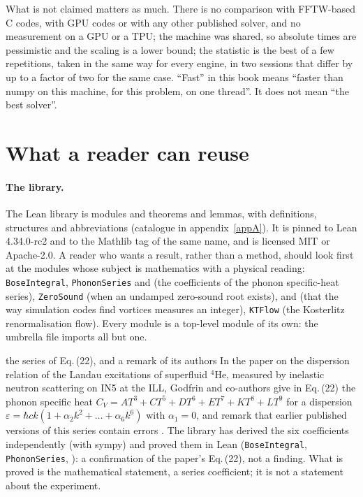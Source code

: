 What is not claimed matters as much. There is no comparison with FFTW-based C codes, with GPU codes or with any other published solver, and no
measurement on a GPU or a TPU; the machine was shared, so absolute times are pessimistic and the scaling is a lower bound; the statistic is the best
of a few repetitions, taken in the same way for every engine, in two sessions that differ by up to a factor of two for the same case. ``Fast'' in this
book means ``faster than numpy on this machine, for this problem, on one thread''. It does not mean ``the best solver''.

\section{What a reader can reuse}\label{ch10:sec-legacy}

\paragraph{The library.} The Lean library \cite{Callens2026lib} is \NxLibModules{} modules and \NxLibThm{} theorems and lemmas, with \NxLibDef{} definitions,
structures and abbreviations (catalogue in appendix~\ref{appA}). It is pinned to Lean 4.34.0-rc2 and to the Mathlib tag of the same name, and is licensed
MIT or Apache-2.0. A reader who wants a result, rather than a method, should look first at the modules whose subject is mathematics with a physical
reading: \texttt{BoseIntegral}, \texttt{PhononSeries} and  (the coefficients of the phonon specific-heat series),
\texttt{ZeroSound} (when an undamped zero-sound root exists),  and  (that the way simulation codes find
vortices measures an integer), \texttt{KTFlow} (the Kosterlitz renormalisation flow). Every module is a top-level module of its own: the umbrella file
 imports all but one.

\begin{godfrinbox}{the series of Eq.\,(22), and a remark of its authors}
In the paper on the dispersion relation of the Landau excitations of superfluid $^4$He, measured by inelastic neutron scattering on IN5 at the ILL,
Godfrin and co-authors give in Eq.\,(22) the phonon specific heat $C_V=AT^3+CT^5+DT^6+ET^7+KT^8+LT^9$ for a dispersion
$\varepsilon=\hbar ck(1+\alpha_2k^2+\dots+\alpha_6k^6)$ with $\alpha_1=0$, and remark that earlier published versions of this series contain
errors \cite{Godfrin2021}. The library has derived the six coefficients independently (with sympy) and proved them in Lean
(\texttt{BoseIntegral}, \texttt{PhononSeries}, ): a confirmation of the paper's Eq.\,(22), not a finding. What is proved is
the mathematical statement, a series coefficient; it is not a statement about the experiment.
\end{godfrinbox}

